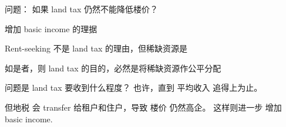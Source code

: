 问题： 如果 land tax 仍然不能降低楼价？ 

增加 basic income 的理据

Rent-seeking 不是 land tax 的理由，但稀缺资源是

如是者，则 land tax 的目的，必然是将稀缺资源作公平分配

问题是 land tax 要收到什么程度？  也许，直到 平均收入 追得上为止。

但地税 会 transfer 给租户和住户，导致 楼价 仍然高企。  这样则进一步 增加 basic income.



\printbibliography

